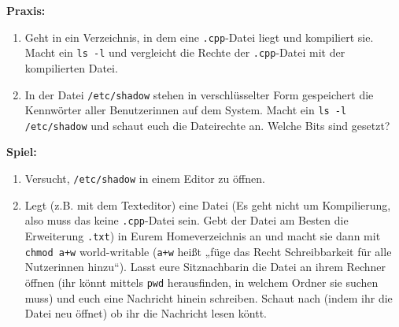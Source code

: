 \textbf{Praxis:}
\begin{enumerate}
    \item Geht in ein Verzeichnis, in dem eine \texttt{.cpp}-Datei liegt und
        kompiliert sie. Macht ein \texttt{ls -l} und vergleicht die Rechte der
        \texttt{.cpp}-Datei mit der kompilierten Datei.
    \item In der Datei \texttt{/etc/shadow} stehen in verschlüsselter Form
        gespeichert die Kennwörter aller Benutzerinnen auf dem System. Macht ein
        \texttt{ls -l /etc/shadow} und schaut euch die Dateirechte an. Welche
        Bits sind gesetzt?
\end{enumerate}

\textbf{Spiel:}
\begin{enumerate}
    \item Versucht, \texttt{/etc/shadow} in einem Editor zu öffnen.
    \item Legt (z.B. mit dem Texteditor) eine Datei (Es geht nicht um
        Kompilierung, also muss das keine \texttt{.cpp}-Datei sein. Gebt der
        Datei am Besten die Erweiterung \texttt{.txt}) in Eurem Homeverzeichnis
        an und macht sie dann mit \texttt{chmod a+w} world-writable
        (\texttt{a+w} heißt „füge das Recht Schreibbarkeit für alle Nutzerinnen
        hinzu“).  Lasst eure Sitznachbarin die Datei an ihrem Rechner öffnen
        (ihr könnt mittels \texttt{pwd} herausfinden, in welchem Ordner sie
        suchen muss) und euch eine Nachricht hinein schreiben. Schaut nach
        (indem ihr die Datei neu öffnet) ob ihr die Nachricht lesen köntt.
\end{enumerate}
